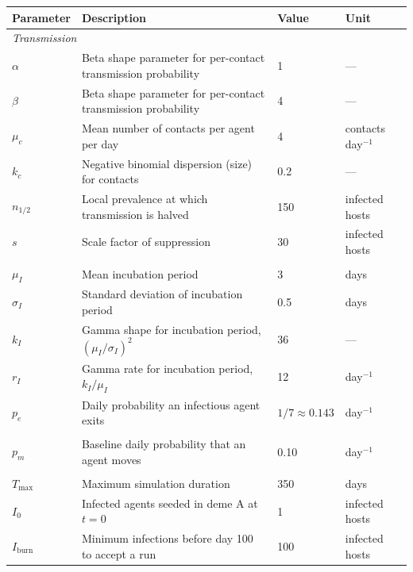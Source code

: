 \documentclass[11pt, letterpaper, oneside]{article}
\begin{document}
\begin{table}[H]
    \centering
    \footnotesize
    \begin{tabular}{llll}
        \toprule
        Parameter & Description & Value & Unit \\
        \midrule
        \multicolumn{4}{l}{\textit{Transmission}} \\
        $\alpha$     & Beta shape parameter for per-contact transmission probability & 1 & --- \\
        $\beta$      & Beta shape parameter for per-contact transmission probability & 4 & --- \\
        $\mu_{c}$    & Mean number of contacts per agent per day & 4 & contacts day$^{-1}$ \\
        $k_{c}$      & Negative binomial dispersion (size) for contacts & 0.2 & --- \\
        $n_{1/2}$    & Local prevalence at which transmission is halved & 150 & infected hosts \\
        $s$          & Scale factor of suppression & 30 & infected hosts \\
        \addlinespace
        \multicolumn{4}{l}{\textit{Infection history}} \\
        $\mu_{I}$    & Mean incubation period & 3 & days \\
        $\sigma_{I}$ & Standard deviation of incubation period & 0.5 & days \\
        $k_{I}$      & Gamma shape for incubation period, $(\mu_{I}/\sigma_{I})^{2}$ & 36 & --- \\
        $r_{I}$      & Gamma rate for incubation period, $k_{I}/\mu_{I}$ & 12 & day$^{-1}$ \\
        $p_{e}$      & Daily probability an infectious agent exits & $1/7 \approx 0.143$ & day$^{-1}$ \\
        \addlinespace
        \multicolumn{4}{l}{\textit{Movement}} \\
        $p_{m}$      & Baseline daily probability that an agent moves & 0.10 & day$^{-1}$ \\
        \addlinespace
        \multicolumn{4}{l}{\textit{Simulation control}} \\
        $T_{\max}$   & Maximum simulation duration & 350 & days \\
        $I_{0}$      & Infected agents seeded in deme A at $t = 0$ & 1 & infected hosts \\
        $I_{\mathrm{burn}}$ & Minimum infections before day 100 to accept a run & 100 & infected hosts \\

\end{tabular}
\end{table}
\end{document}
